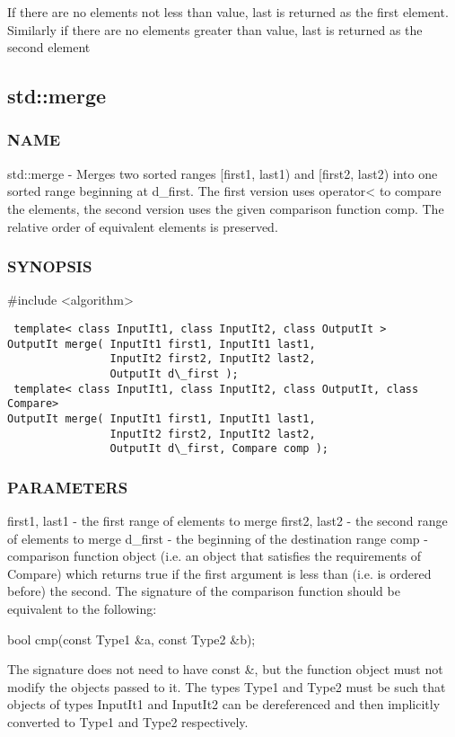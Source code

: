 If there are no elements not less than value, last is returned as the first element. Similarly if there are no elements greater than value, last is returned as the second element



\subsection{std::merge}

\subsubsection{NAME}
std::merge - Merges two sorted ranges [first1, last1) and [first2, last2) into one sorted range beginning at d\_first. The first version uses operator< to compare the elements, the second version uses the given comparison function comp. The relative order of equivalent elements is preserved.

\subsubsection{SYNOPSIS}
\#include <algorithm>

\begin{lstlisting}
 template< class InputIt1, class InputIt2, class OutputIt >
OutputIt merge( InputIt1 first1, InputIt1 last1,
                InputIt2 first2, InputIt2 last2,
                OutputIt d\_first );
 template< class InputIt1, class InputIt2, class OutputIt, class Compare>
OutputIt merge( InputIt1 first1, InputIt1 last1,
                InputIt2 first2, InputIt2 last2,
                OutputIt d\_first, Compare comp );
\end{lstlisting}

\subsubsection{PARAMETERS}
first1, last1 - the first range of elements to merge
first2, last2 - the second range of elements to merge
d\_first - the beginning of the destination range
comp - comparison function object (i.e. an object that satisfies the requirements of Compare) which returns true if the first argument is less than (i.e. is ordered before) the second.
The signature of the comparison function should be equivalent to the following:

 bool cmp(const Type1 \&a, const Type2 \&b);

The signature does not need to have const \&, but the function object must not modify the objects passed to it.
The types Type1 and Type2 must be such that objects of types InputIt1 and InputIt2 can be dereferenced and then implicitly converted to Type1 and Type2 respectively.

